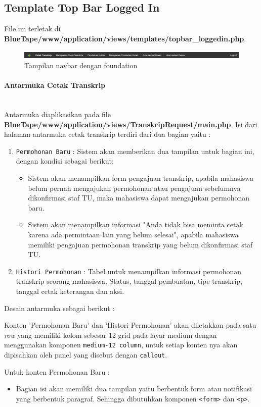 \documentclass[a4paper,twoside]{article}
\newcommand{\myparagraph}[1]{\paragraph{#1}\mbox{}\\}
\begin{document}
\begin{enumerate}
		\subsection{Template Top Bar Logged In}
		File ini terletak di \textbf{BlueTape/www/application/views/templates/topbar\_loggedin.php}.
		\begin{figure} [H]
			\centering  
			\includegraphics[scale=0.5]{Tampilan_navbar_zurb.png}  
			\caption{Tampilan navbar dengan foundation} 
		\end{figure}
		\myparagraph{Antarmuka Cetak Transkrip}
		Antarmuka diaplikasikan pada file \textbf{BlueTape/www/application/views/TranskripRequest/main.php}. Isi dari halaman antarmuka cetak transkrip terdiri dari dua bagian yaitu :
		\begin{enumerate}
			\item \verb|Permohonan Baru| : Sistem akan memberikan dua tampilan untuk bagian ini, dengan kondisi sebagai berikut:
			\begin{itemize}
				\item Sistem akan menampilkan form pengajuan transkrip, apabila mahasiswa belum pernah mengajukan permohonan atau pengajuan sebelumnya  dikonfirmasi staf TU, maka mahasiswa dapat mengajukan permohonan baru.
				\item Sistem akan menampilkan informasi "Anda tidak bisa meminta cetak karena ada permintaan lain yang belum selesai", apabila mahasiswa memiliki pengajuan permohonan transkrip yang belum dikonfirmasi staf TU. 
			\end{itemize}
			\item \verb|Histori Permohonan| : Tabel untuk menampilkan informasi permohonan transkrip seorang mahasiswa. Status, tanggal pembuatan, tipe transkrip, tanggal cetak keterangan dan aksi. 
		\end{enumerate}
		Desain antarmuka sebagai berikut : \par
		Konten 'Permohonan Baru' dan 'Histori Permohonan' akan diletakkan pada satu \textit{row} yang memiliki kolom sebesar 12 grid pada layar medium dengan menggunakan komponen \colorbox{mygray}{\texttt{medium-12 column}}, untuk setiap konten nya akan dipisahkan oleh panel yang disebut dengan \texttt{callout}. \par
		Untuk konten Permohonan Baru :
		\begin{itemize}
			\item Bagian isi akan memiliki dua tampilan yaitu berbentuk form atau notifikasi yang berbentuk paragraf. Sehingga dibutuhkan komponen \verb|<form>| dan \verb|<p>|.

\end{itemize}
\end{enumerate}
\end{document}
